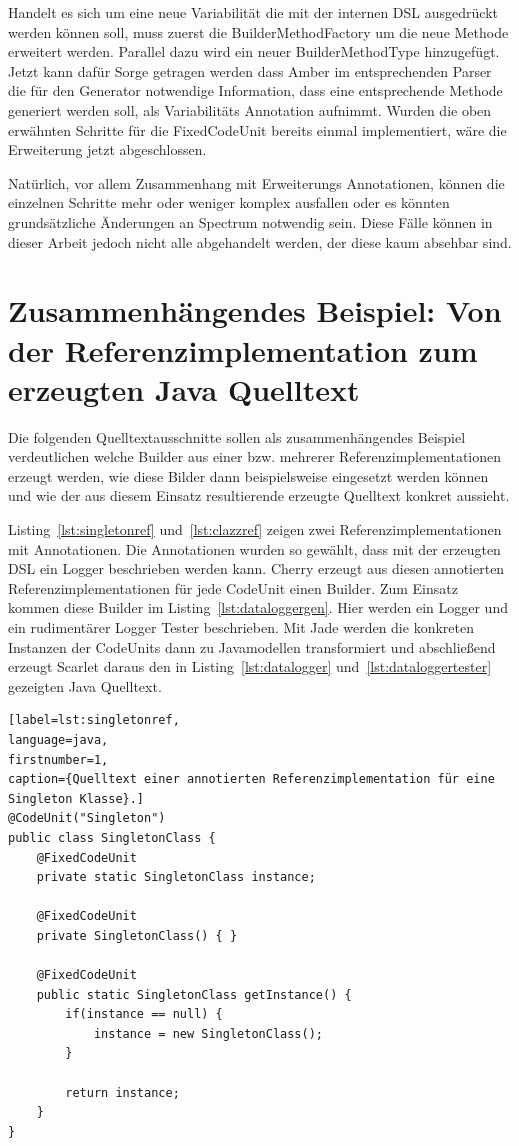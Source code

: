 \documentclass[12pt,oneside,a4paper,parskip]{scrbook}
\begin{document}
Handelt es sich um eine neue Variabilität die mit der internen DSL ausgedrückt werden können soll, muss zuerst die BuilderMethodFactory um die neue Methode erweitert werden. Parallel dazu wird ein neuer BuilderMethodType hinzugefügt. Jetzt kann dafür Sorge getragen werden dass Amber im entsprechenden Parser die für den Generator notwendige Information, dass eine entsprechende Methode generiert werden soll, als Variabilitäts Annotation aufnimmt. Wurden die oben erwähnten Schritte für die FixedCodeUnit bereits einmal implementiert, wäre die Erweiterung jetzt abgeschlossen.

Natürlich, vor allem Zusammenhang mit Erweiterungs Annotationen, können die einzelnen Schritte mehr oder weniger komplex ausfallen oder es könnten grundsätzliche Änderungen an Spectrum notwendig sein. Diese Fälle können in dieser Arbeit jedoch nicht alle abgehandelt werden, der diese kaum absehbar sind.

\section{Zusammenhängendes Beispiel: Von der Referenzimplementation zum erzeugten Java Quelltext}

Die folgenden Quelltextausschnitte sollen als zusammenhängendes Beispiel verdeutlichen welche Builder aus einer bzw. mehrerer Referenzimplementationen erzeugt werden, wie diese Bilder dann beispielsweise eingesetzt werden können und wie der aus diesem Einsatz resultierende erzeugte Quelltext konkret aussieht.

Listing~\ref{lst:singletonref} und~\ref{lst:clazzref} zeigen zwei Referenzimplementationen mit Annotationen. Die Annotationen wurden so gewählt, dass mit der erzeugten DSL ein Logger beschrieben werden kann. Cherry erzeugt aus diesen annotierten Referenzimplementationen für jede CodeUnit einen Builder. Zum Einsatz kommen diese Builder im Listing~\ref{lst:dataloggergen}. Hier werden ein Logger und ein rudimentärer Logger Tester beschrieben. Mit Jade werden die konkreten Instanzen der CodeUnits dann zu Javamodellen transformiert und abschließend erzeugt Scarlet daraus den in Listing~\ref{lst:datalogger} und~\ref{lst:dataloggertester} gezeigten Java Quelltext.

\begin{lstlisting}[label=lst:singletonref,
language=java,
firstnumber=1,
caption={Quelltext einer annotierten Referenzimplementation für eine Singleton Klasse}.]
@CodeUnit("Singleton")
public class SingletonClass {
	@FixedCodeUnit
	private static SingletonClass instance;
	
	@FixedCodeUnit
	private SingletonClass() { }
	
	@FixedCodeUnit
	public static SingletonClass getInstance() {
		if(instance == null) {
			instance = new SingletonClass();
		}
		
		return instance;
	}
}
\end{lstlisting}
\end{document}

